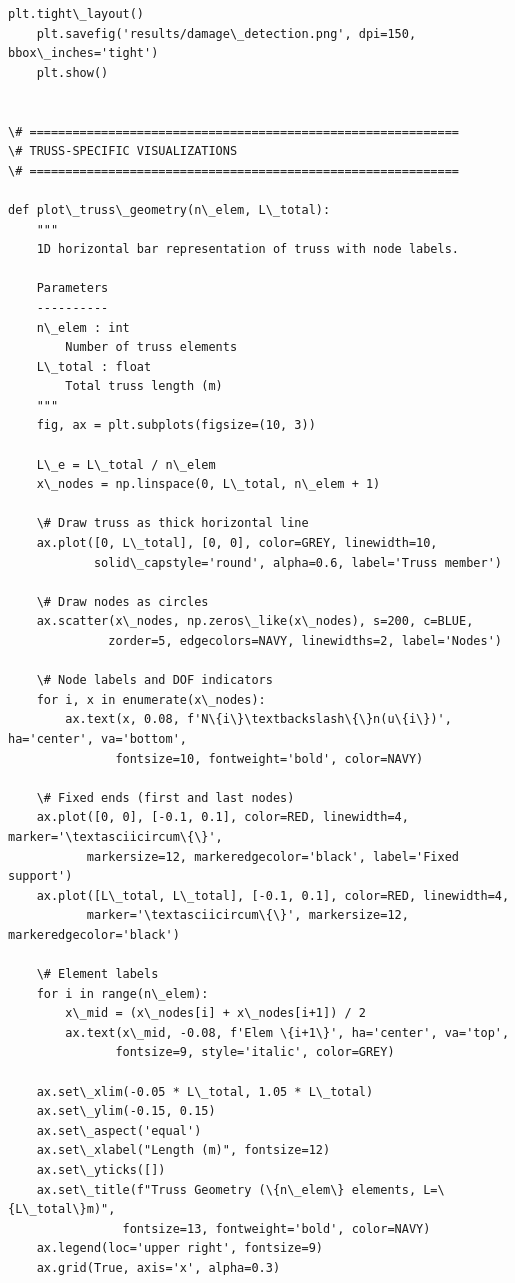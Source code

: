 \documentclass[12pt, a4paper]{article}
\begin{document}
\begin{lstlisting}[style=codestyle, caption={{visualize.py --- Beam and Truss Visualizations}}]
    plt.tight\_layout()
    plt.savefig('results/damage\_detection.png', dpi=150, bbox\_inches='tight')
    plt.show()


\# ============================================================
\# TRUSS-SPECIFIC VISUALIZATIONS
\# ============================================================

def plot\_truss\_geometry(n\_elem, L\_total):
    """
    1D horizontal bar representation of truss with node labels.

    Parameters
    ----------
    n\_elem : int
        Number of truss elements
    L\_total : float
        Total truss length (m)
    """
    fig, ax = plt.subplots(figsize=(10, 3))

    L\_e = L\_total / n\_elem
    x\_nodes = np.linspace(0, L\_total, n\_elem + 1)

    \# Draw truss as thick horizontal line
    ax.plot([0, L\_total], [0, 0], color=GREY, linewidth=10,
            solid\_capstyle='round', alpha=0.6, label='Truss member')

    \# Draw nodes as circles
    ax.scatter(x\_nodes, np.zeros\_like(x\_nodes), s=200, c=BLUE,
              zorder=5, edgecolors=NAVY, linewidths=2, label='Nodes')

    \# Node labels and DOF indicators
    for i, x in enumerate(x\_nodes):
        ax.text(x, 0.08, f'N\{i\}\textbackslash\{\}n(u\{i\})', ha='center', va='bottom',
               fontsize=10, fontweight='bold', color=NAVY)

    \# Fixed ends (first and last nodes)
    ax.plot([0, 0], [-0.1, 0.1], color=RED, linewidth=4, marker='\textasciicircum\{\}',
           markersize=12, markeredgecolor='black', label='Fixed support')
    ax.plot([L\_total, L\_total], [-0.1, 0.1], color=RED, linewidth=4,
           marker='\textasciicircum\{\}', markersize=12, markeredgecolor='black')

    \# Element labels
    for i in range(n\_elem):
        x\_mid = (x\_nodes[i] + x\_nodes[i+1]) / 2
        ax.text(x\_mid, -0.08, f'Elem \{i+1\}', ha='center', va='top',
               fontsize=9, style='italic', color=GREY)

    ax.set\_xlim(-0.05 * L\_total, 1.05 * L\_total)
    ax.set\_ylim(-0.15, 0.15)
    ax.set\_aspect('equal')
    ax.set\_xlabel("Length (m)", fontsize=12)
    ax.set\_yticks([])
    ax.set\_title(f"Truss Geometry (\{n\_elem\} elements, L=\{L\_total\}m)",
                fontsize=13, fontweight='bold', color=NAVY)
    ax.legend(loc='upper right', fontsize=9)
    ax.grid(True, axis='x', alpha=0.3)


\end{lstlisting}
\end{document}
